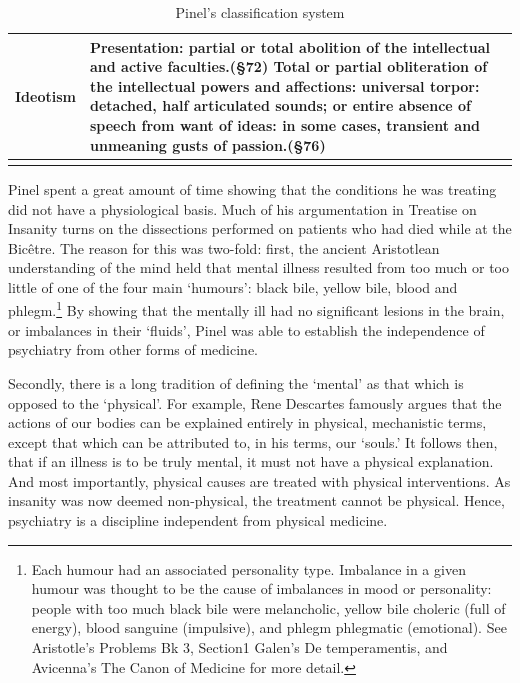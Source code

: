 \begin{refsection}
\begin{longtable}[!t]{ | P{2cm} | P{11cm}  | }
Ideotism&Presentation: partial or total abolition of the intellectual and active faculties.(\S 72) \newline
Total or partial obliteration of the intellectual powers and affections: universal torpor: detached, half articulated sounds; or entire absence of speech from want of ideas: in some cases, transient and unmeaning gusts of passion.(\S 76) \\ \hline
\caption{Pinel’s classification system}
\label{table: pinel}
\end{longtable}


Pinel spent a great amount of time showing that the conditions he was treating did not have a physiological basis. Much of his argumentation in Treatise on Insanity turns on the dissections performed on patients who had died while at the Bicêtre. The reason for this was two-fold: first, the ancient Aristotlean understanding of the mind held that mental illness resulted from too much or too little of one of the four main `humours': black bile, yellow bile, blood and phlegm.\footnote{Each humour had an associated personality type. Imbalance in a given humour was thought to be the cause of imbalances in mood or personality: people with too much black bile were melancholic, yellow bile choleric (full of energy), blood sanguine (impulsive), and phlegm phlegmatic (emotional). See Aristotle's Problems Bk 3, Section1 Galen's De temperamentis, and Avicenna's The Canon of Medicine for more detail.} By showing that the mentally ill had no significant lesions in the brain, or imbalances in their `fluids', Pinel was able to establish the independence of psychiatry from other forms of medicine.

Secondly, there is a long tradition of defining the `mental' as that which is opposed to the `physical'. For example, Rene Descartes famously argues that the actions of our bodies can be explained entirely in physical, mechanistic terms, except that which can be attributed to, in his terms, our `souls.' It follows then, that if an illness is to be truly mental, it must not have a physical explanation. And most importantly, physical causes are treated with physical interventions. As insanity was now deemed non-physical, the treatment cannot be physical. Hence, psychiatry is a discipline independent from physical medicine.


\end{refsection}
